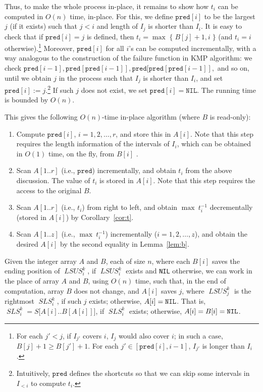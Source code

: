 \documentclass[11pt]{llncs}
\DeclareMathOperator{\lsus}{\mathit{LSUS}}
\DeclareMathOperator{\sls}{\mathit{SLS}}
\newcommand\pred{\mathtt{pred}}
\begin{document}
Thus, to make the whole process in-place, it remains to show how $t_i$
can be computed in $O(n)$ time, in-place.  For this, we define
$\pred[i]$ to be the largest $j$ (if it exists) such that $j < i$ and
length of $I_j$ is shorter than $I_i$.  It is easy to check that if
$\pred[i] = j$ is defined, then $t_i = \max\; \{\; B[j]+1, i \; \}$
(and $t_i = i$ otherwise).\footnote{For each $j' < j$, if $I_{j'}$ covers $i$, $I_j$ would also cover
  $i$; in such a case, $B[j] + 1 \geq B[j'] + 1$.  For each $j' \in
  [\pred[i], i-1]$, $I_{j'}$ is longer than $I_i$.}  Moreover,
$\pred[i]$ for all $i$'s can be computed incrementally, with a way
analogous to the construction of the failure function in KMP
algorithm: we check $\pred[i-1], \pred[\pred[i-1]],
\pred[\pred[\pred[i-1]],$ and so on, until we obtain $j$ in the
process such that $I_j$ is shorter than $I_i$, and set $\pred[i] :=
j$.\footnote{Intuitively, $\pred$ defines the shortcuts so that we can
  skip some intervals in $I_{<i}$ to compute $t_i$.} If such $j$ does
not exist, we set $\mathtt{pred}[i]=\mathtt{NIL}$. The running time
is bounded by $O(n)$.

\bigskip

\noindent
This gives the following $O(n)$-time in-place algorithm (where $B$ is read-only):
\begin{enumerate}
  \setlength{\itemsep}{0pt} \item Compute $\pred[i]$,
  $i=1,2,\ldots,r$, and store this in $A[i]$.
  Note that this step requires the length information of the intervals
  of $I_i$, which can be obtained in $O(1)$ time, on the fly, from
  $B[i]$ .
\item Scan $A[1..r]$ (i.e., $\pred$) incrementally,
  and obtain $t_i$ from
  the above discussion.  The value of $t_i$ is stored in $A[i]$.  Note
  that this step requires the access to the original $B$.
\item Scan $A[1..r]$ (i.e., $t_i$) from right to left, and obtain
  $\max\ t_i^{-1}$ decrementally (stored in $A[i]$) by
  Corollary~\ref{cor:t}. 
\item Scan $A[1..z]$ (i.e., $\max\ t_i^{-1}$)
  incrementally ($i=1,2,\ldots,z$), and obtain the
  desired $A[i]$ by the second equality in Lemma~\ref{lem:b}.
\end{enumerate}


\begin{lemma}
\label{lem:sls}

Given the integer array $A$ and $B$, each of size $n$, 
where each $B[i]$ saves the ending
position of $\lsus_i^k$, if $\lsus_i^k$ exists and {\tt NIL}
otherwise, we can work in the place of
array $A$ and $B$, using $O(n)$ time, such that, 
in the end of computation,
array $B$ does not change, and $A[i]$ saves $j$, where
$\lsus_j^k$ is the rightmost $\sls_i^k$, 
if such $j$ exists; otherwise, $A[i]={\tt NIL}$.
That is, 
$\sls_i^k = S\bigl[A[i].. B[A[i]]\bigr]$, if $\sls_i^k$ exists;
otherwise, $A[i] = B[i] = {\tt NIL}$.
\end{lemma}
\end{document}
